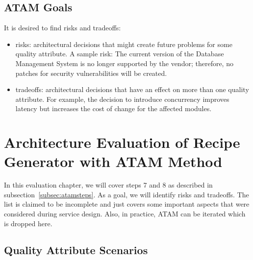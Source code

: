 \subsection{ATAM Goals}
\label{subsec:atamgoa}
It is desired to find risks and tradeoffs:
\begin{itemize}
    \item risks: architectural decisions that might create future problems for some quality attribute. A sample risk: The current version of the Database Management System is no longer supported by the vendor; therefore, no patches for security vulnerabilities will be created.
    \item tradeoffs: architectural decisions that have an effect on more than one quality attribute.     For example, the decision to introduce concurrency improves latency but increases the cost of change for the affected modules. 
\end{itemize}

\section{Architecture Evaluation of Recipe Generator with ATAM Method}
In this evaluation chapter, we will cover steps 7 and 8 as described in subsection~\ref{subsec:atamsteps}. As a goal, we will identify risks and tradeoffs. The list is claimed to be incomplete and just covers some important aspects that were considered during service design. Also, in practice, ATAM can be iterated which is dropped here.

\subsection{Quality Attribute Scenarios}

